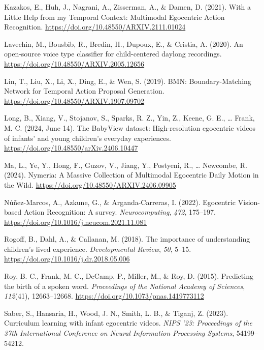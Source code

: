 \documentclass[
  man,floatsintext]{apa6}
\newlength{\cslhangindent}
\newenvironment{CSLReferences}[2] %
 {\begin{list}{}{%
  \setlength{\itemindent}{0pt}
  \setlength{\leftmargin}{0pt}
  \setlength{\parsep}{0pt}
  \ifodd #1
   \setlength{\leftmargin}{\cslhangindent}
   \setlength{\itemindent}{-1\cslhangindent}
  \fi
  \setlength{\itemsep}{#2\baselineskip}}}
 {\end{list}}
\begin{document}
\begin{CSLReferences}{1}{0}
Kazakos, E., Huh, J., Nagrani, A., Zisserman, A., \& Damen, D. (2021). With a {Little Help} from my {Temporal Context}: {Multimodal Egocentric Action Recognition}. \url{https://doi.org/10.48550/ARXIV.2111.01024}

Lavechin, M., Bousbib, R., Bredin, H., Dupoux, E., \& Cristia, A. (2020). An open-source voice type classifier for child-centered daylong recordings. \url{https://doi.org/10.48550/ARXIV.2005.12656}

Lin, T., Liu, X., Li, X., Ding, E., \& Wen, S. (2019). {BMN}: {Boundary-Matching Network} for {Temporal Action Proposal Generation}. \url{https://doi.org/10.48550/ARXIV.1907.09702}

Long, B., Xiang, V., Stojanov, S., Sparks, R. Z., Yin, Z., Keene, G. E., \ldots{} Frank, M. C. (2024, June 14). The {BabyView} dataset: {High-resolution} egocentric videos of infants' and young children's everyday experiences. \url{https://doi.org/10.48550/arXiv.2406.10447}

Ma, L., Ye, Y., Hong, F., Guzov, V., Jiang, Y., Postyeni, R., \ldots{} Newcombe, R. (2024). Nymeria: {A Massive Collection} of {Multimodal Egocentric Daily Motion} in the {Wild}. \url{https://doi.org/10.48550/ARXIV.2406.09905}

Núñez-Marcos, A., Azkune, G., \& Arganda-Carreras, I. (2022). Egocentric {Vision-based Action Recognition}: {A} survey. \emph{Neurocomputing}, \emph{472}, 175--197. \url{https://doi.org/10.1016/j.neucom.2021.11.081}

Rogoff, B., Dahl, A., \& Callanan, M. (2018). The importance of understanding children's lived experience. \emph{Developmental Review}, \emph{50}, 5--15. \url{https://doi.org/10.1016/j.dr.2018.05.006}

Roy, B. C., Frank, M. C., DeCamp, P., Miller, M., \& Roy, D. (2015). Predicting the birth of a spoken word. \emph{Proceedings of the National Academy of Sciences}, \emph{112}(41), 12663--12668. \url{https://doi.org/10.1073/pnas.1419773112}

Saber, S., Hansaria, H., Wood, J. N., Smith, L. B., \& Tiganj, Z. (2023). Curriculum learning with infant egocentric videos. \emph{NIPS '23: Proceedings of the 37th International Conference on Neural Information Processing Systems}, 54199--54212.


\end{CSLReferences}
\end{document}
